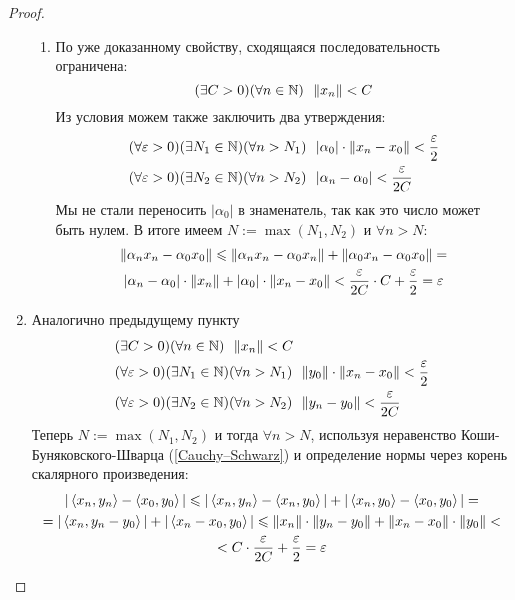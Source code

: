 \begin{proof}
\begin{enumerate}
\begin{enumerate}
			\item По уже доказанному свойству,
				сходящаяся последовательность ограничена:
				\[
					(\exists C > 0)(\forall n \in \mathbb{N})\ \ \|x_n\| < C
				\]
				Из условия можем также заключить два утверждения:
				\begin{align*}
					&(\forall \varepsilon > 0)(\exists N_1 \in \mathbb{N})
					(\forall n > N_1)\ \ |\alpha_0| \cdot
					\|x_n - x_0\| < \frac{\varepsilon}{2}
					\\
					&(\forall \varepsilon > 0)(\exists N_2 \in \mathbb{N})
					(\forall n > N_2)\ \ |\alpha_n - \alpha_0|
					< \frac{\varepsilon}{2C}
				\end{align*}
				Мы не стали переносить $|\alpha_0|$ в знаменатель,
				так как это число может быть нулем.
				В итоге имеем $N := \max(N_1, N_2)$ и $\forall n > N$:
				\begin{multline*}
					\|\alpha_n x_n - \alpha_0 x_0\| \leqslant
					\|\alpha_n x_n - \alpha_0 x_n\| +
					\|\alpha_0 x_n - \alpha_0 x_0\| =
					\\
					|\alpha_n - \alpha_0| \cdot \|x_n\| +
					|\alpha_0| \cdot \|x_n - x_0\| <
					\frac{\varepsilon}{2C} \cdot C + \frac{\varepsilon}{2} = \varepsilon
				\end{multline*}
		\end{enumerate}
	
		\item Аналогично предыдущему пункту
		\begin{align*}
			&(\exists C > 0)(\forall n \in \mathbb{N})\ \ \|x_n\| < C
			\\
			&(\forall \varepsilon > 0)(\exists N_1 \in \mathbb{N})
			(\forall n > N_1)\ \ \|y_0\| \cdot
			\|x_n - x_0\| < \frac{\varepsilon}{2}
			\\
			&(\forall \varepsilon > 0)(\exists N_2 \in \mathbb{N})
			(\forall n > N_2)\ \ \|y_n - y_0\| < \frac{\varepsilon}{2C}
		\end{align*}
		Теперь $N := \max(N_1, N_2)$ и тогда $\forall n > N$, используя
		неравенство Коши-Буняковского-Шварца (\ref{Cauchy–Schwarz}) и определение
		нормы через корень скалярного произведения:
		\begin{multline*}
			|\left\langle x_n, y_n\right\rangle - \left\langle x_0, y_0\right\rangle| \leqslant
			|\left\langle x_n, y_n\right\rangle - \left\langle x_n, y_0\right\rangle| +
			|\left\langle x_n, y_0\right\rangle - \left\langle x_0, y_0\right\rangle| =
			\\
			= |\left\langle x_n, y_n - y_0\right\rangle| + |\left\langle x_n - x_0, y_0\right\rangle|
			\leqslant \|x_n\| \cdot \|y_n - y_0\| +
			\|x_n - x_0\| \cdot \|y_0\| <
			\\
			< C \cdot \frac{\varepsilon}{2C} + \frac{\varepsilon}{2} = \varepsilon
		\end{multline*}
		

\end{enumerate}
\end{proof}
